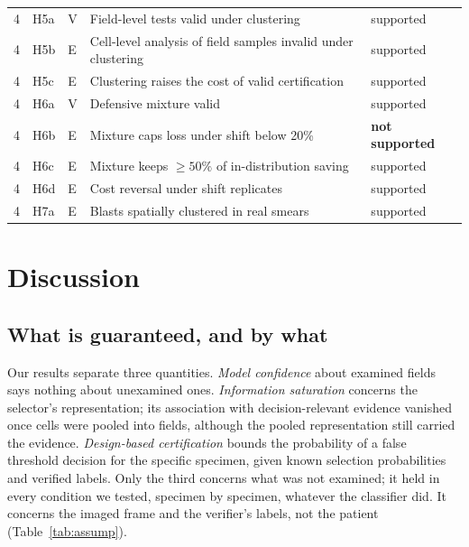 \documentclass[preprint,12pt]{elsarticle}
\theoremstyle{remark}
\theoremstyle{definition}
\begin{document}
\begin{table}[!htbp]
\begin{tabular}{@{}lllL{8.2cm}l@{}}
4 & H5a & V & Field-level tests valid under clustering & supported\\
4 & H5b & E & Cell-level analysis of field samples invalid under clustering & supported\\
4 & H5c & E & Clustering raises the cost of valid certification & supported\\
4 & H6a & V & Defensive mixture valid & supported\\
4 & H6b & E & Mixture caps loss under shift below 20\% & \textbf{not supported}\\
4 & H6c & E & Mixture keeps $\ge50\%$ of in-distribution saving & supported\\
4 & H6d & E & Cost reversal under shift replicates & supported\\
4 & H7a & E & Blasts spatially clustered in real smears & supported\\
\bottomrule
\end{tabular}
\end{table}

\section{Discussion}
\subsection{What is guaranteed, and by what}
Our results separate three quantities. \emph{Model confidence} about examined fields says nothing about unexamined ones. \emph{Information saturation} concerns the selector's representation; its association with decision-relevant evidence vanished once cells were pooled into fields, although the pooled representation still carried the evidence. \emph{Design-based certification} bounds the probability of a false threshold decision for the specific specimen, given known selection probabilities and verified labels. Only the third concerns what was not examined; it held in every condition we tested, specimen by specimen, whatever the classifier did. It concerns the imaged frame and the verifier's labels, not the patient (Table~\ref{tab:assump}).
\end{document}
